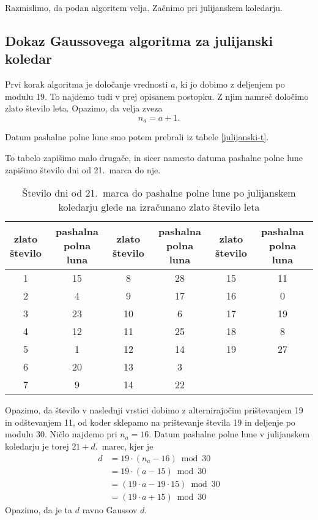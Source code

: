 \documentclass[a4paper,12pt]{article}
\begin{document}
Razmislimo, da podan algoritem velja. Začnimo pri julijanskem koledarju. 

\subsection{Dokaz Gaussovega algoritma za julijanski koledar}
Prvi korak algoritma je določanje vrednosti $a$, ki jo dobimo z deljenjem po modulu 19.
To najdemo tudi v prej opisanem postopku. Z njim namreč določimo zlato število leta.
Opazimo, da velja zveza $$n_a = a + 1.$$

Datum pashalne polne lune smo potem prebrali iz tabele \ref{julijanski-t}.

To tabelo zapišimo malo drugače, in sicer namesto datuma pashalne polne lune 
zapišimo število dni od 21.\ marca do nje.

\begin{table}
    \centering
    \caption{Število dni od 21.\ marca do pashalne polne lune po julijanskem koledarju glede na izračunano zlato število leta}
    \label{julijanski-tm}
    \begin{tabular}{| c c | c c | c c |}
        \hline
        \makecell{zlato \\ število} & \makecell{pashalna \\ polna luna} & \makecell{zlato \\ število} & \makecell{pashalna \\ polna luna} & \makecell{zlato \\ število} & \makecell{pashalna \\ polna luna} \\ \hline
        1 & 15 & 8 & 28 & 15 & 11 \\  
        2 & 4 & 9 & 17 & 16 & 0 \\
        3 & 23 & 10 & 6 & 17 & 19 \\
        4 & 12 & 11 & 25 & 18 & 8 \\
        5 & 1 & 12 & 14 & 19 & 27 \\
        6 & 20 & 13 & 3 & & \\
        7 & 9 & 14 & 22 & & \\ \hline
    \end{tabular}
\end{table}

Opazimo, da število v naslednji vrstici dobimo z alternirajočim prištevanjem 
19 in odštevanjem 11, od koder sklepamo na prištevanje števila 19 in deljenje 
po modulu 30. Ničlo najdemo pri $n_a = 16$. Datum pashalne polne lune v 
julijanskem koledarju je torej $21 + d$.\ marec, kjer je 
\begin{align*}
    d &= 19 \cdot (n_a - 16) \bmod 30 \\
    &= 19 \cdot (a - 15) \bmod 30 \\
    &= (19 \cdot a - 19 \cdot 15) \bmod 30 \\
    &= (19 \cdot a + 15) \bmod 30
\end{align*}
Opazimo, da je ta $d$ ravno Gaussov $d$.
\end{document}
